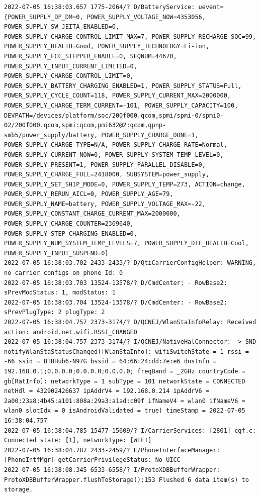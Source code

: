 \documentclass[a4paper,12pt]{book}
\begin{document}
\begin{lstlisting}
2022-07-05 16:38:03.657 1775-2064/? D/BatteryService: uevent={POWER_SUPPLY_DP_DM=0, POWER_SUPPLY_VOLTAGE_NOW=4353056, POWER_SUPPLY_SW_JEITA_ENABLED=0, POWER_SUPPLY_CHARGE_CONTROL_LIMIT_MAX=7, POWER_SUPPLY_RECHARGE_SOC=99, POWER_SUPPLY_HEALTH=Good, POWER_SUPPLY_TECHNOLOGY=Li-ion, POWER_SUPPLY_FCC_STEPPER_ENABLE=0, SEQNUM=44670, POWER_SUPPLY_INPUT_CURRENT_LIMITED=0, POWER_SUPPLY_CHARGE_CONTROL_LIMIT=0, POWER_SUPPLY_BATTERY_CHARGING_ENABLED=1, POWER_SUPPLY_STATUS=Full, POWER_SUPPLY_CYCLE_COUNT=118, POWER_SUPPLY_CURRENT_MAX=2000000, POWER_SUPPLY_CHARGE_TERM_CURRENT=-101, POWER_SUPPLY_CAPACITY=100, DEVPATH=/devices/platform/soc/200f000.qcom,spmi/spmi-0/spmi0-02/200f000.qcom,spmi:qcom,pmi632@2:qcom,qpnp-smb5/power_supply/battery, POWER_SUPPLY_CHARGE_DONE=1, POWER_SUPPLY_CHARGE_TYPE=N/A, POWER_SUPPLY_CHARGE_RATE=Normal, POWER_SUPPLY_CURRENT_NOW=0, POWER_SUPPLY_SYSTEM_TEMP_LEVEL=0, POWER_SUPPLY_PRESENT=1, POWER_SUPPLY_PARALLEL_DISABLE=0, POWER_SUPPLY_CHARGE_FULL=2418000, SUBSYSTEM=power_supply, POWER_SUPPLY_SET_SHIP_MODE=0, POWER_SUPPLY_TEMP=273, ACTION=change, POWER_SUPPLY_RERUN_AICL=0, POWER_SUPPLY_AGE=79, POWER_SUPPLY_NAME=battery, POWER_SUPPLY_VOLTAGE_MAX=-22, POWER_SUPPLY_CONSTANT_CHARGE_CURRENT_MAX=2000000, POWER_SUPPLY_CHARGE_COUNTER=2369640, POWER_SUPPLY_STEP_CHARGING_ENABLED=0, POWER_SUPPLY_NUM_SYSTEM_TEMP_LEVELS=7, POWER_SUPPLY_DIE_HEALTH=Cool, POWER_SUPPLY_INPUT_SUSPEND=0}
2022-07-05 16:38:03.702 2433-2433/? D/QtiCarrierConfigHelper: WARNING, no carrier configs on phone Id: 0
2022-07-05 16:38:03.703 13524-13578/? D/CmdCenter: - RowBase2: sPrevModStatus: 1, modStatus: 1
2022-07-05 16:38:03.704 13524-13578/? D/CmdCenter: - RowBase2: sPrevPlugType: 2 plugType: 2
2022-07-05 16:38:04.757 2373-3174/? D/QCNEJ/WlanStaInfoRelay: Received action: android.net.wifi.RSSI_CHANGED
2022-07-05 16:38:04.757 2373-3174/? I/QCNEJ/NativeHalConnector: -> SND notifyWlanStaStatusChanged([WlanStaInfo]: wifiSwitchState = 1 rssi = -66 ssid = BTBHub6-N97G bssid = 64:66:24:dd:7e:e6 dnsInfo = 192.168.0.1;0.0.0.0;0.0.0.0;0.0.0.0; freqBand = _2GHz countryCode = gb[RatInfo]: networkType = 1 subType = 101 networkState = CONNECTED netHdl = 432902426637 ipAddrV4 = 192.168.0.214 ipAddrV6 = 2a00:23a8:4b45:a101:808a:29a3:a1ad:c09f ifNameV4 = wlan0 ifNameV6 = wlan0 slotIdx = 0 isAndroidValidated = true) timeStamp = 2022-07-05 16:38:04.757
2022-07-05 16:38:04.785 15477-15609/? I/CarrierServices: [2801] cgf.c: Connected state: [1], networkType: [WIFI]
2022-07-05 16:38:04.787 2433-2459/? E/PhoneInterfaceManager: [PhoneIntfMgr] getCarrierPrivilegeStatus: No UICC
2022-07-05 16:38:08.345 6533-6558/? I/ProtoXDBBufferWrapper: ProtoXDBBufferWrapper.flushToStorage():153 Flushed 6 data item(s) to storage.

\end{lstlisting}
\end{document}
